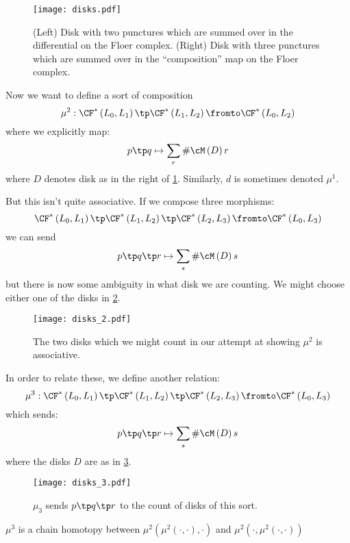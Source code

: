 \documentclass{amsart}
\begin{document}
\begin{figure}
\texttt{[image: disks.pdf]}
\caption{(Left) Disk with two punctures which are summed over in the 
differential on the Floer complex.
(Right) Disk with three punctures which are summed over in the ``composition'' map
on the Floer complex.}
\label{fig:disks}
\end{figure}

Now we want to define a sort of composition 
\begin{equation}
\mu^2: \CF^*\left( L_0 , L_1 \right) \tp \CF^*\left( L_1 , L_2 \right) \fromto
\CF^*\left( L_0 , L_2 \right)
\end{equation}
where we explicitly map:
\begin{equation}
p\tp q \mapsto \sum_r \# \cM\left( D \right) r
\end{equation}
where $D$ denotes disk as in the right of \cref{fig:disks}.
Similarly, $d$ is sometimes denoted $\mu^1$.

But this isn't quite associative.
If we compose three morphisms:
\begin{equation}
\CF^*\left( L_0 , L_1 \right) \tp 
\CF^*\left( L_1 , L_2 \right) \tp 
\CF^*\left( L_2 , L_3 \right) 
\fromto \CF^*\left( L_0 , L_3 \right)
\end{equation}
we can send 
\begin{equation}
p\tp q \tp r \mapsto
\sum_s \# \cM\left( D \right)s
\end{equation}
but there is now some ambiguity in what disk we are counting. 
We might choose either one of the disks in \cref{fig:disks2}.
\begin{figure}
\texttt{[image: disks\_2.pdf]}
\caption{The two disks which we might count in our attempt at 
showing $\mu^2$ is associative.}
\label{fig:disks2}
\end{figure}

In order to relate these, we define another relation:
\begin{equation}
\mu^3:
\CF^*\left( L_0 , L_1 \right) \tp 
\CF^*\left( L_1 , L_2 \right) \tp 
\CF^*\left( L_2 , L_3 \right) 
\fromto \CF^*\left( L_0 , L_3 \right)
\end{equation}
which sends:
\begin{equation}
p\tp q \tp r \mapsto
\sum_s \# \cM \left( D \right) s
\end{equation}
where the disks $D$ are as in \cref{fig:disks3}.
\begin{figure}
\texttt{[image: disks\_3.pdf]}
\caption{$\mu_3$ sends $p\tp q \tp r$ to the count of
disks of this sort.}
\label{fig:disks3}
\end{figure}
\begin{fact}
$\mu^3$ is a chain homotopy between $\mu^2\left( \mu^2\left( \cdot , \cdot \right) , \cdot \right)$
and $\mu^2\left( \cdot , \mu^2\left( \cdot , \cdot \right) \right)$
\end{fact}
\end{document}

